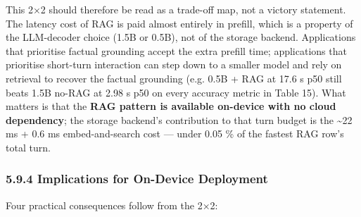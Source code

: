 This 2×2 should therefore be read as a trade-off map, not a victory statement.
The latency cost of RAG is paid almost entirely in prefill, which is a property
of the LLM-decoder choice (1.5B or 0.5B), not of the storage backend.
Applications that prioritise factual grounding accept the extra prefill time;
applications that prioritise short-turn interaction can step down to a smaller
model and rely on retrieval to recover the factual grounding (e.g. 0.5B + RAG at
17.6 s p50 still beats 1.5B no-RAG at 2.98 s p50 on every accuracy metric in
Table 15). What matters is that the \textbf{RAG pattern is available on-device
with no cloud dependency}; the storage backend's contribution to that turn
budget is the \textasciitilde22 ms + 0.6 ms embed-and-search cost --- under 0.05
\% of the fastest RAG row's total turn.

\subsubsection{5.9.4 Implications for On-Device
Deployment}\label{implications-for-on-device-deployment}

Four practical consequences follow from the 2×2:

